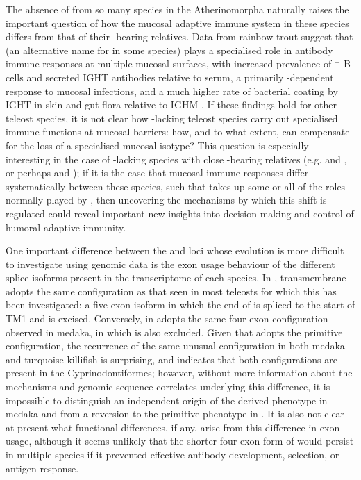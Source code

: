 The absence of  from so many species in the Atherinomorpha naturally raises the important question of how the mucosal adaptive immune system in these species differs from that of their -bearing relatives. Data from rainbow trout suggest that  (an alternative name for  in some species) plays a specialised role in antibody immune responses at multiple mucosal surfaces, with increased prevalence of $^+$ B-cells and secreted IGHT antibodies relative to serum, a primarily -dependent response to mucosal infections, and a much higher rate of bacterial coating by IGHT in skin and gut flora relative to IGHM \parencite{zhang2010igtgut,xu2013igtskin}.
If these findings hold for other teleost species, it is not clear how -lacking teleost species carry out specialised immune functions at mucosal barriers: how, and to what extent, can  compensate for the loss of a specialised mucosal isotype? This question is especially interesting in the case of -lacking species with close -bearing relatives (e.g. \nfu and , or perhaps  and ); if it is the case that mucosal immune responses differ systematically between these species, such that  takes up some or all of the roles normally played by , then uncovering the mechanisms by which this shift is regulated could reveal important new insights into decision-making and control of humoral adaptive immunity.

One important difference between the \Xma and \Nfu loci whose evolution is more difficult to investigate using genomic data is the exon usage behaviour of the different splice isoforms present in the transcriptome of each species. In \Xma, transmembrane  adopts the same configuration as that seen in most teleosts for which this has been investigated: a five-exon isoform in which the end of  is spliced to the start of TM1 and  is excised. Conversely, in \Nfu {} adopts the same four-exon configuration observed in medaka, in which  is also excluded. Given that \Xma adopts the primitive configuration, the recurrence of the same unusual configuration in both medaka and turquoise killifish is surprising, and indicates that both configurations are present in the Cyprinodontiformes; however, without more information about the mechanisms and genomic sequence correlates underlying this difference, it is impossible to distinguish an independent origin of the derived phenotype in medaka and \Nfu from a reversion to the primitive phenotype in \Xma. It is also not clear at present what functional differences, if any, arise from this difference in exon usage, although it seems unlikely that the shorter four-exon form of  would persist in multiple species if it prevented effective antibody development, selection, or antigen response.

